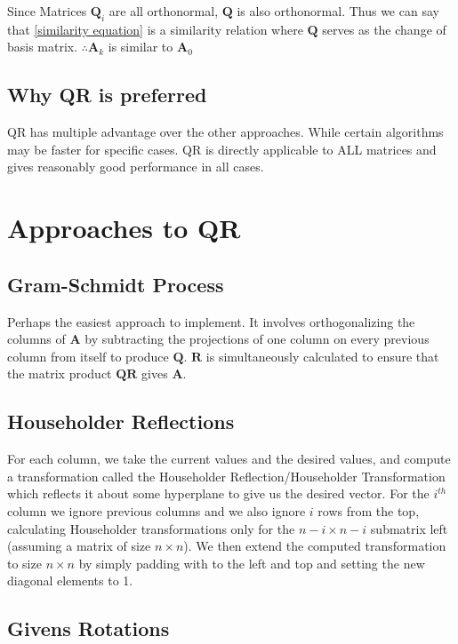 \documentclass[12pt,a4paper]{article}
\let\vec\mathbf
\begin{document}
\noindent Since Matrices $\vec{Q}_i$ are all orthonormal, $\vec{Q}$ is also orthonormal. Thus we can say that \eqref{similarity equation} is a similarity relation where $\vec{Q}$ serves as the change of basis matrix.
$\therefore \vec{A}_k$ is similar to $\vec{A}_0$

\subsection{Why QR is preferred}

QR has multiple advantage over the other approaches. While certain algorithms may be faster for specific cases. QR is directly applicable to ALL matrices and gives reasonably good performance in all cases.

\section{Approaches to QR}

\subsection{Gram-Schmidt Process}

Perhaps the easiest approach to implement. It involves orthogonalizing the columns of $\vec{A}$ by subtracting the projections of one column on every previous column from itself to produce $\vec{Q}$. $\vec{R}$ is simultaneously calculated to ensure that the matrix product $\vec{QR}$ gives $\vec{A}$.

\subsection{Householder Reflections}

For each column, we take the current values and the desired values, and compute a transformation called the Householder Reflection/Householder Transformation which reflects it about some hyperplane to give us the desired vector. For the $i^{th}$ column we ignore previous columns and we also ignore $i$ rows from the top, calculating Householder transformations only for the $n-i \times n-i$ submatrix left (assuming a matrix of size $n \times n$). We then extend the computed transformation to size $n \times n$ by simply padding with to the left and top and setting the new diagonal elements to 1.

\subsection{Givens Rotations}
\end{document}
